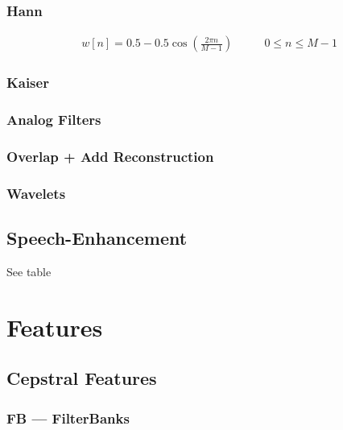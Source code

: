 \subsection{Hann}
\begin{align}
    w[n] = 0.5 - 0.5\cos\left( \frac{ 2\pi n }{ M - 1 } \right) & \qquad 0 \leq n \leq M-1
\end{align}


\subsection{Kaiser}
\subsection{Analog Filters}

\subsection{Overlap + Add Reconstruction}
\subsection{Wavelets}

\section{Speech-Enhancement}
See table







\chapter{Features}
\section{Cepstral Features}
\subsection{FB --- FilterBanks}

